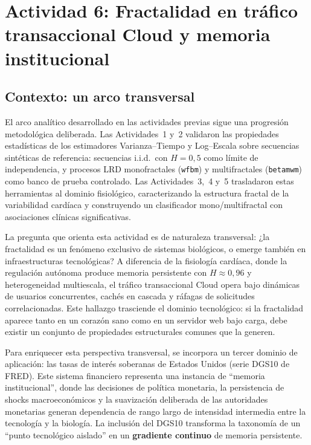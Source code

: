 \newpage
\section{Actividad 6: Fractalidad en tráfico transaccional Cloud y memoria institucional}

\subsection{Contexto: un arco transversal}

El arco analítico desarrollado en las actividades previas sigue una progresión
metodológica deliberada. Las Actividades~1 y~2 validaron las propiedades
estadísticas de los estimadores Varianza--Tiempo y Log--Escala sobre secuencias
sintéticas de referencia: secuencias i.i.d.\ con $H=0{,}5$ como límite de
independencia, y procesos LRD monofractales (\texttt{wfbm}) y multifractales
(\texttt{betamwm}) como banco de prueba controlado. Las Actividades~3,~4 y~5
trasladaron estas herramientas al dominio fisiológico, caracterizando la
estructura fractal de la variabilidad cardíaca y construyendo un clasificador
mono/multifractal con asociaciones clínicas significativas.

La pregunta que orienta esta actividad es de naturaleza transversal: ¿la
fractalidad es un fenómeno exclusivo de sistemas biológicos, o emerge también en
infraestructuras tecnológicas? A diferencia de la fisiología cardíaca, donde la
regulación autónoma produce memoria persistente con $H\approx0{,}96$ y
heterogeneidad multiescala, el tráfico transaccional Cloud opera bajo dinámicas
de usuarios concurrentes, cachés en cascada y ráfagas de solicitudes
correlacionadas. Este hallazgo trasciende el dominio tecnológico: si la
fractalidad aparece tanto en un corazón sano como en un servidor web bajo carga,
debe existir un conjunto de propiedades estructurales comunes que la generen.

Para enriquecer esta perspectiva transversal, se incorpora un tercer dominio de
aplicación: las tasas de interés soberanas de Estados Unidos (serie DGS10 de
FRED). Este sistema financiero representa una instancia de ``memoria
institucional'', donde las decisiones de política monetaria, la persistencia de
shocks macroeconómicos y la suavización deliberada de las autoridades monetarias
generan dependencia de rango largo de intensidad intermedia entre la tecnología
y la biología. La inclusión del DGS10 transforma la taxonomía de un ``punto
tecnológico aislado'' en un \textbf{gradiente continuo} de memoria persistente.

